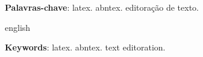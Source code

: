 \documentclass[
	12pt,				%
    oneside,            %
	a4paper,			%
	english,			%
	brazilian,		    %
	]{AcademicoUFT}
\begin{document}
\setlength{\absparsep}{18pt} %
\begin{resumo}
\lipsum[1] %

\textbf{Palavras-chave}: latex. abntex. editoração de texto.
\end{resumo}


\begin{resumo}[Abstract]
    \begin{otherlanguage*}{english}
    \lipsum[1] %
    
    \textbf{Keywords}: latex. abntex. text editoration.
    \end{otherlanguage*}
\end{resumo}


\listoffigures*
\cleardoublepage


\listoftables*
\cleardoublepage
\end{document}
